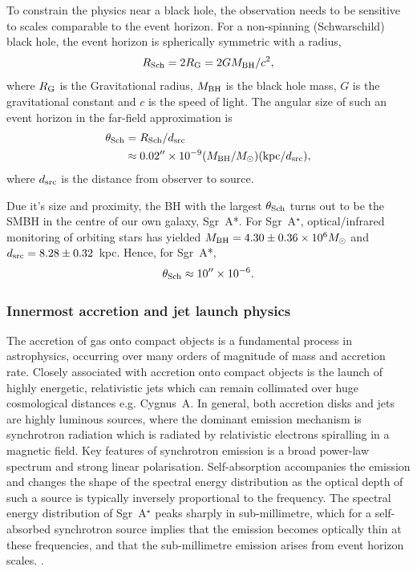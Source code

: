 To constrain the physics near a black hole, the observation needs to be sensitive to scales comparable to the event horizon. For a non-spinning (Schwarschild) black hole, the event horizon is spherically symmetric with a radius, 
\begin{equation}
R_{\rm Sch} = 2 R_{\rm G} = 2 G M_{\rm BH} /c^2,
\end{equation}
where $R_{\rm G}$ is the Gravitational radius, $M_{\rm BH}$ is the black hole mass, $G$ is the gravitational constant and $c$ is the speed of light. The angular size of such an event horizon in the far-field approximation is
\begin{align}
\theta_{\rm Sch} &= R_{\rm Sch} / d_{\rm src}\\
&\approx 0.02^{\prime \prime} \times 10^{-9} (M_{\rm BH}/M_\odot)({\rm kpc}/d_{\rm src}),
\end{align}
where $d_{\rm src}$ is the distance from observer to source. 

Due it's size and proximity, the BH with the largest $\theta_{\rm Sch}$ turns out to be the SMBH in the centre of our own galaxy, Sgr~A*. For Sgr~A$^\star$, optical/infrared monitoring of orbiting stars \citep{Gillessen_2009} has yielded ${M_{\rm BH} = 4.30 \pm 0.36 \times 10^{6} M_\odot}$ and ${d_{\rm src}= 8.28 \pm 0.32}$~kpc. Hence, for Sgr~A*,  $$\theta_{\rm Sch} \approx 10^{\prime \prime}\times 10^{-6}.$$

\subsubsection{Innermost accretion and jet launch physics}

The accretion of gas onto compact objects is a fundamental process in astrophysics, occurring over many orders of magnitude of mass and accretion rate. Closely associated with accretion onto compact objects is the launch of highly energetic, relativistic jets which can remain collimated over huge cosmological distances e.g. Cygnus~A. In general, both accretion disks and jets are highly luminous sources, where the dominant emission mechanism is synchrotron radiation which is radiated by relativistic electrons spiralling in a magnetic field. Key features of synchrotron emission is a broad power-law spectrum and strong linear polarisation. Self-absorption accompanies the emission and changes the shape of the spectral energy distribution as the optical depth of such a source is typically inversely proportional to the frequency. 
The spectral energy distribution of Sgr~A$^\star$ peaks sharply in sub-millimetre, which for a self-absorbed synchrotron source implies that the emission becomes optically thin at these frequencies, and that the sub-millimetre emission arises from event horizon scales. \citep{Serabyn_1997,Falcke_1998}. 


